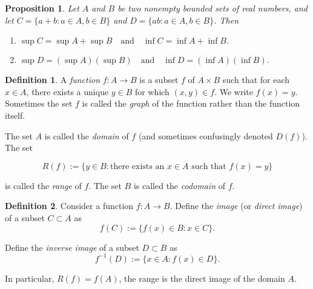 \documentclass{article}
\newtheorem{proposition}{Proposition}[section]
\theoremstyle{definition}
\newtheorem{definition}{Definition}[section]
\theoremstyle{remark}
\begin{document}
\begin{proposition} \label{ex:sup_inf_algebra}
Let \( A \) and \( B \) be two nonempty bounded sets of real numbers, and let \( C = \{a + b : a \in A, b \in B\} \) and \( D = \{ab : a \in A, b \in B\} \). Then 
\begin{enumerate}
\item \(\sup C = \sup A + \sup B \quad \text{and} \quad \inf C = \inf A + \inf B.\)
\item \(\sup D = (\sup A)(\sup B) \quad \text{and} \quad \inf D = (\inf A)(\inf B). \)
\end{enumerate}

\end{proposition}
















\begin{definition} \label{def:function}
A \textit{function} \( f: A \to B \) is a subset \( f \) of \( A \times B \) such that for each \( x \in A \),
there exists a unique \( y \in B \) for which \( (x, y) \in f \). We write \( f(x) = y \). Sometimes the set \( f \) is
called the \textit{graph} of the function rather than the function itself.

The set \( A \) is called the \textit{domain} of \( f \) (and sometimes confusingly denoted \( D(f) \)). The set

\[
R(f) := \{y \in B : \text{there exists an } x \in A \text{ such that } f(x) = y\}
\]

is called the \textit{range} of \( f \). The set \( B \) is called the \textit{codomain} of \( f \).
\end{definition}















\begin{definition} \label{def:image_inverse_image}
Consider a function \( f: A \to B \). Define the \textit{image} (or \textit{direct image}) of a subset \( C \subset A \) as
\[
f(C) := \{ f(x) \in B : x \in C \}.
\]

Define the \textit{inverse image} of a subset \( D \subset B \) as
\[
f^{-1}(D) := \{ x \in A : f(x) \in D \}.
\]

In particular, \( R(f) = f(A) \), the range is the direct image of the domain \( A \).
\end{definition}
\end{document}

